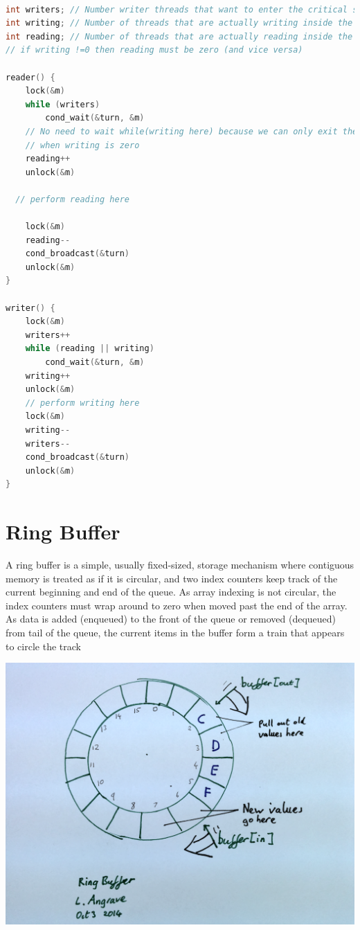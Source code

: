 \begin{lstlisting}[language=C]

int writers; // Number writer threads that want to enter the critical section (some or all of these may be blocked)
int writing; // Number of threads that are actually writing inside the C.S. (can only be zero or one)
int reading; // Number of threads that are actually reading inside the C.S.
// if writing !=0 then reading must be zero (and vice versa)

reader() {
    lock(&m)
    while (writers)
        cond_wait(&turn, &m)
    // No need to wait while(writing here) because we can only exit the above loop
    // when writing is zero
    reading++
    unlock(&m)

  // perform reading here

    lock(&m)
    reading--
    cond_broadcast(&turn)
    unlock(&m)
}

writer() {
    lock(&m)  
    writers++  
    while (reading || writing)   
        cond_wait(&turn, &m)  
    writing++  
    unlock(&m)  
    // perform writing here  
    lock(&m)  
    writing--  
    writers--  
    cond_broadcast(&turn)  
    unlock(&m)  
}
\end{lstlisting}

\section{Ring Buffer}\label{Ring Buffer}

A ring buffer is a simple, usually fixed-sized, storage mechanism where contiguous memory is treated as if it is circular, and two index counters keep track of the current beginning and end of the queue. As array indexing is not circular, the index counters must wrap around to zero when moved past the end of the array. As data is added (enqueued) to the front of the queue or removed (dequeued) from tail of the queue, the current items in the buffer form a train that appears to circle the track 

\begin{center}
\includegraphics[width=.5\textwidth]{synchronization/images/ring_buffer.png}
\end{center}

